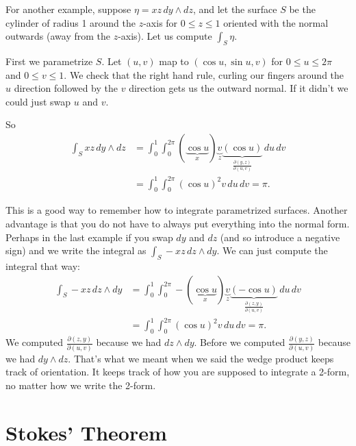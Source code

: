 \documentclass[12pt]{article}
\begin{document}
For another example, suppose $\eta = xz \, dy \wedge dz$,
and let the surface $S$ be the cylinder of radius 1 around the $z$-axis
for $0 \leq z \leq 1$ oriented with the normal outwards (away from the
$z$-axis).   Let us compute $\int_S \eta$.

First we parametrize $S$.  Let $(u,v)$ map to $(\cos u, \sin u, v)$
for $0 \leq u \leq 2\pi$ and $0 \leq v \leq 1$.  We check that the
right hand rule, curling our fingers around the $u$ direction followed by
the $v$ direction gets us the outward normal.  If it didn't we could just
swap $u$ and $v$.

So
\begin{equation*}
\begin{split}
\int_S xz \, dy \wedge dz
& =
\int_0^1
\int_0^{2\pi}
(\underbrace{\cos u}_{x}) \underbrace{v}_{z}
\underbrace{( \cos u )}_{\frac{\partial (y,z)}{\partial (u,v)}}
\, du \, dv
\\
& =
\int_0^1
\int_0^{2\pi}
{(\cos u)}^2 v \, du \, dv
= \pi .
\end{split}
\end{equation*}

This is a good way to remember how to integrate parametrized surfaces.
Another advantage is that you do not have to always put everything into the normal form.
Perhaps in the last example if you swap $dy$ and $dz$ (and so introduce a negative sign)
and we write the integral as $\int_S -xz \, dz \wedge dy$.  We can just compute the integral
that way:
\begin{equation*}
\begin{split}
\int_S -xz \, dz \wedge dy
& =
\int_0^1
\int_0^{2\pi}
- (\underbrace{\cos u}_{x}) \underbrace{v}_{z}
\underbrace{( - \cos u )}_{\frac{\partial (z,y)}{\partial (u,v)}}
\, du \, dv
\\
& =
\int_0^1
\int_0^{2\pi}
{(\cos u)}^2 v \, du \, dv
= \pi .
\end{split}
\end{equation*}
We computed
$\frac{\partial (z,y)}{\partial (u,v)}$ because we had $dz \wedge dy$.
Before we computed
$\frac{\partial (y,z)}{\partial (u,v)}$ because we had $dy \wedge dz$.
That's what we meant when we said the wedge product keeps track of orientation.  It keeps track
of how you are supposed to integrate a 2-form, no matter how we write the 2-form.

\section*{Stokes' Theorem}
\end{document}
